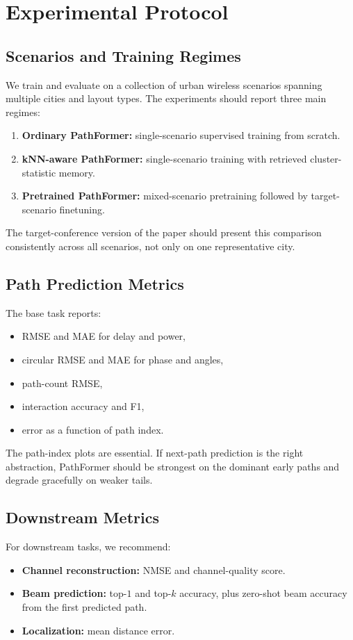 \documentclass[11pt]{article}
\begin{document}
\section{Experimental Protocol}
\subsection{Scenarios and Training Regimes}
We train and evaluate on a collection of urban wireless scenarios spanning multiple cities and layout types. The experiments should report three main regimes:
\begin{enumerate}[leftmargin=1.5em]
    \item \textbf{Ordinary PathFormer:} single-scenario supervised training from scratch.
    \item \textbf{kNN-aware PathFormer:} single-scenario training with retrieved cluster-statistic memory.
    \item \textbf{Pretrained PathFormer:} mixed-scenario pretraining followed by target-scenario finetuning.
\end{enumerate}
The target-conference version of the paper should present this comparison consistently across all scenarios, not only on one representative city.

\subsection{Path Prediction Metrics}
The base task reports:
\begin{itemize}[leftmargin=1.5em]
    \item RMSE and MAE for delay and power,
    \item circular RMSE and MAE for phase and angles,
    \item path-count RMSE,
    \item interaction accuracy and F1,
    \item error as a function of path index.
\end{itemize}
The path-index plots are essential. If next-path prediction is the right abstraction, PathFormer should be strongest on the dominant early paths and degrade gracefully on weaker tails.

\subsection{Downstream Metrics}
For downstream tasks, we recommend:
\begin{itemize}[leftmargin=1.5em]
    \item \textbf{Channel reconstruction:} NMSE and channel-quality score.
    \item \textbf{Beam prediction:} top-$1$ and top-$k$ accuracy, plus zero-shot beam accuracy from the first predicted path.
    \item \textbf{Localization:} mean distance error.
\end{itemize}
\end{document}

